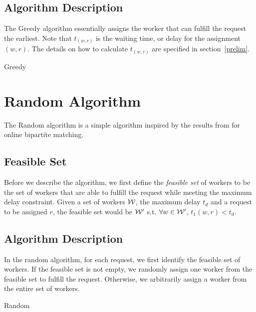 \documentclass[urop]{socreport}
\begin{document}
\subsection{Algorithm Description}
The Greedy algorithm essentially assigns the worker that can fulfill the request the earliest. Note that $t_{(w,r)}$ is the waiting time, or delay for the assignment $(w,r)$. The details on how to calculate $t_{(w,r)}$ are specified in section~\ref{prelim}. \\

\begin{algorithm}[H]
\SetAlgoLined
{}
 \caption{Greedy}
\end{algorithm}

\section{Random Algorithm}
The Random algorithm is a simple algorithm inspired by the results from \cite{karp} for online bipartite matching. 

\subsection{Feasible Set}
Before we describe the algorithm, we first define the \textit{feasible set} of workers to be the set of workers that are able to fulfill the request while meeting the maximum delay constraint. Given a set of workers $\mathcal{W}$, the maximum delay $t_d$ and a request to be assigned $r$, the feasible set would be $\mathcal{W}'$ s.t. $\forall w \in \mathcal{W}'$, $t_1(w,r) < t_d $.

\subsection{Algorithm Description}
In the random algorithm, for each request, we first identify the feasible set of workers. If the feasible set is not empty, we randomly assign one worker  from the feasible set to fulfill the request. Otherwise, we arbitrarily assign a worker from the entire set of workers. \\

\begin{algorithm}[H]
\SetAlgoLined
{}
 \caption{Random}
\end{algorithm}
\end{document}
